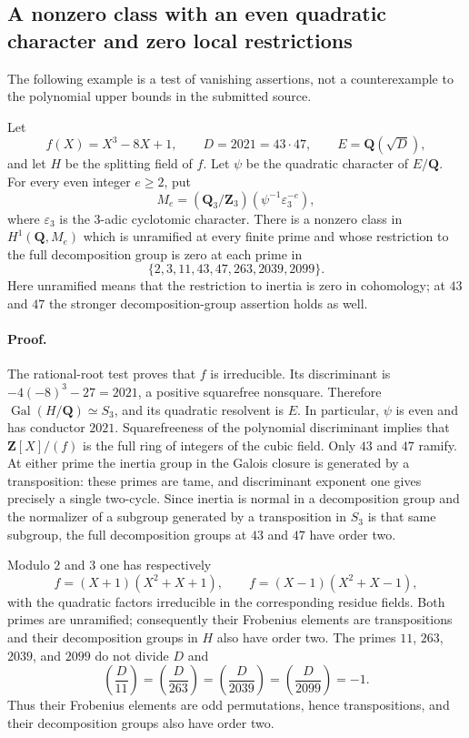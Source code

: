 \documentclass[11pt,a4paper]{article}
\theoremstyle{remark}
\newcommand{\src}[1]{\cite{#1}}
\begin{document}
\src{S-propz-continued,milne-ant,milne-cft}

\subsection{A nonzero class with an even quadratic character and zero local restrictions}

The following example is a test of vanishing assertions, not a counterexample
to the polynomial upper bounds in the submitted source.

Let
\[
 f(X)=X^3-8X+1,\qquad D=2021=43\cdot47,
 \qquad E=\mathbf Q(\sqrt D),
\]
and let $H$ be the splitting field of $f$.  Let $\psi$ be the quadratic
character of $E/\mathbf Q$.  For every even integer $e\geq2$, put
\[
 M_e=(\mathbf Q_3/\mathbf Z_3)(\psi^{-1}\varepsilon_3^{-e}),
\]
where $\varepsilon_3$ is the $3$-adic cyclotomic character.
There is a nonzero class in $H^1(\mathbf Q,M_e)$ which is unramified
at every finite prime and whose restriction to the full decomposition
group is zero at each prime in
\[
 \{2,3,11,43,47,263,2039,2099\}.
\]
Here unramified means that the restriction to inertia is zero in
cohomology; at $43$ and $47$ the stronger decomposition-group assertion
holds as well.

\paragraph{Proof.}
The rational-root test proves that $f$ is irreducible.  Its discriminant is
$-4(-8)^3-27=2021$, a positive squarefree nonsquare.  Therefore
$\operatorname{Gal}(H/\mathbf Q)\simeq S_3$, and its quadratic resolvent is
$E$.  In particular, $\psi$ is even and has conductor $2021$.
Squarefreeness of the polynomial discriminant implies that
$\mathbf Z[X]/(f)$ is the full ring of integers of the cubic field.
Only $43$ and $47$ ramify.  At either prime the inertia group in the
Galois closure is generated by a transposition: these primes are tame,
and discriminant exponent one gives precisely a single two-cycle.
Since inertia is normal in a decomposition group and the normalizer of
a subgroup generated by a transposition in $S_3$ is that same subgroup,
the full decomposition groups at $43$ and $47$ have order two.

Modulo $2$ and $3$ one has respectively
\[
 f=(X+1)(X^2+X+1),\qquad
 f=(X-1)(X^2+X-1),
\]
with the quadratic factors irreducible in the corresponding residue
fields.  Both primes are unramified; consequently their Frobenius
elements are transpositions and their decomposition groups in $H$
also have order two.  The primes $11$, $263$, $2039$, and $2099$ do not divide $D$ and
\[
 \left(\frac{D}{11}\right)=\left(\frac{D}{263}\right)=\left(\frac{D}{2039}\right)=
 \left(\frac{D}{2099}\right)=-1.
\]
Thus their Frobenius elements are odd permutations, hence
transpositions, and their decomposition groups also have order two.
\end{document}
